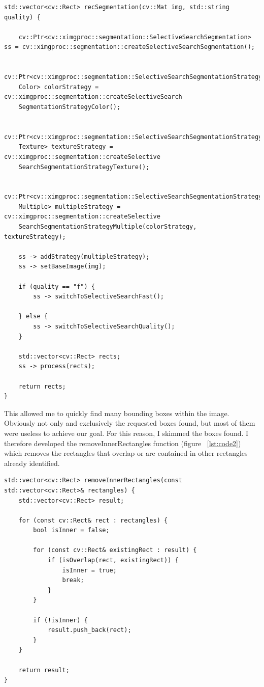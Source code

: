 \documentclass[
	a4paper, %
	10pt, %
	unnumberedsections, %
	twoside, %
]{LTJournalArticle}
\begin{document}
\lstset{style=mystyle}
\begin{lstlisting}[caption=recSegmentation, label=lst:codice]
std::vector<cv::Rect> recSegmentation(cv::Mat img, std::string quality) {

    cv::Ptr<cv::ximgproc::segmentation::SelectiveSearchSegmentation> ss = cv::ximgproc::segmentation::createSelectiveSearchSegmentation();

    cv::Ptr<cv::ximgproc::segmentation::SelectiveSearchSegmentationStrategy
    Color> colorStrategy = cv::ximgproc::segmentation::createSelectiveSearch
    SegmentationStrategyColor();
    
    cv::Ptr<cv::ximgproc::segmentation::SelectiveSearchSegmentationStrategy
    Texture> textureStrategy = cv::ximgproc::segmentation::createSelective
    SearchSegmentationStrategyTexture();
    
    cv::Ptr<cv::ximgproc::segmentation::SelectiveSearchSegmentationStrategy
    Multiple> multipleStrategy = cv::ximgproc::segmentation::createSelective
    SearchSegmentationStrategyMultiple(colorStrategy, textureStrategy);

    ss -> addStrategy(multipleStrategy);
    ss -> setBaseImage(img);

    if (quality == "f") {
        ss -> switchToSelectiveSearchFast();

    } else {
        ss -> switchToSelectiveSearchQuality();
    }

    std::vector<cv::Rect> rects;
    ss -> process(rects);

    return rects;
}
\end{lstlisting}

 This allowed me to quickly find many bounding boxes within the image. Obviously not only and exclusively the requested boxes found, but most of them were useless to achieve our goal. For this reason, I skimmed the boxes found. I therefore developed the removeInnerRectangles function (figure \lstlistingname~\ref{lst:code2}) which removes the rectangles that overlap or are contained in other rectangles already identified.
  
\lstset{style=mystyle}
\begin{lstlisting}[caption=removeInnerRectangles, label=lst:codice2]
std::vector<cv::Rect> removeInnerRectangles(const std::vector<cv::Rect>& rectangles) {
    std::vector<cv::Rect> result;

    for (const cv::Rect& rect : rectangles) {
        bool isInner = false;

        for (const cv::Rect& existingRect : result) {
            if (isOverlap(rect, existingRect)) {
                isInner = true;
                break;
            }
        }

        if (!isInner) {
            result.push_back(rect);
        }
    }

    return result;
}
\end{lstlisting}
\end{document}
